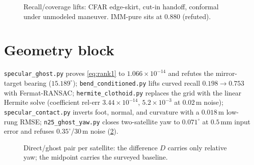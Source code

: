 \documentclass[11pt,oneside]{book}
\begin{document}
\begin{figure}[htbp]
\centering
{}
\caption{Recall/coverage lifts: CFAR edge-skirt, cut-in handoff, conformal
under unmodeled maneuver. IMM-pure sits at $0.880$ (refuted).}
\label{fig:recall-bars}
\end{figure}

\section{Geometry block}
\label{sec:code-geometry}

\texttt{specular\_ghost.py} proves \cref{eq:rank1} to $1.066\times10^{-14}$
and refutes the mirror-target bearing ($15.189^\circ$); \texttt{bend\_conditioned.py}
lifts curved recall $0.198\to0.753$ with Fermat-RANSAC;
\texttt{hermite\_clothoid.py} replaces the grid with the linear Hermite
solve (coefficient rel-err $3.44\times10^{-14}$, $5.2\times10^{-3}$ at
$0.02\,\mathrm{m}$ noise); \texttt{specular\_contact.py} inverts foot,
normal, and curvature with a $0.018\,\mathrm{m}$ low-rung RMSE;
\texttt{n25\_ghost\_yaw.py} closes two-satellite yaw to $0.071^\circ$ at
$0.5\,\mathrm{mm}$ input error and refuses $0.35^\circ$/30\,m noise
(\cref{fig:ghost-pair}).

\begin{figure}[htbp]
\centering
{}
\caption{Direct/ghost pair per satellite: the difference $D$ carries only
relative yaw; the midpoint carries the surveyed baseline.}
\label{fig:ghost-pair}
\end{figure}
\end{document}
